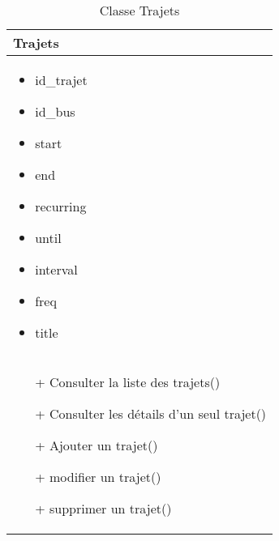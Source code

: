 \begin{table}[H]
    \begin{center}
        \begin{tabular}{|Z{5cm}|}
            \hline
            \textbf{Trajets}\\
            \hline
            \begin{itemize}
                \item id\_trajet
                \item id\_bus
                \item start
                \item end
                \item recurring
                \item until
                \item interval
                \item freq
                \item title
            \end{itemize}\\
            \hline
            \begin{itemize}
                \item[+] Consulter la liste des trajets()
                \item[+] Consulter les détails d'un seul trajet() 
                \item[+] Ajouter un trajet()
                \item[+] modifier un trajet()
                \item[+] supprimer un trajet()
            \end{itemize}
            \\
            \hline
        \end{tabular}	
        \caption{Classe Trajets}
    \end{center}
\end{table}

